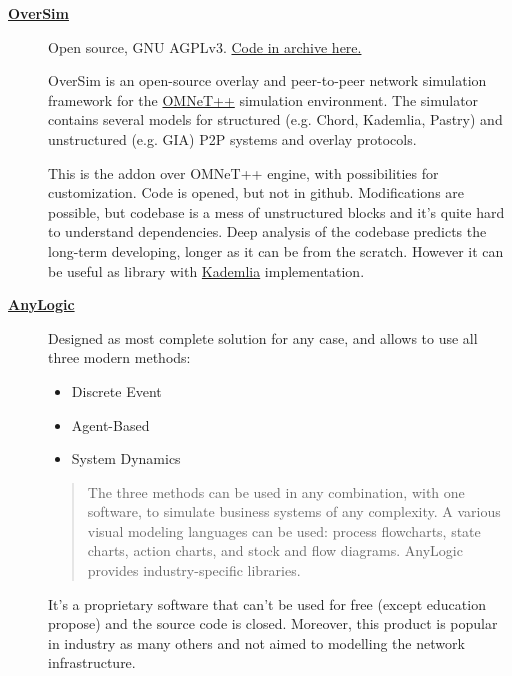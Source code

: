 \documentclass[12pt,oneside]{article}
\begin{document}
\begin{description}
                        \item[\href{http://www.oversim.org/wiki}{\textbf{OverSim}}]
                      Open source, GNU AGPLv3. \href{http://www.oversim.org/wiki/OverSimDownload}{Code in archive here.}

                      OverSim is an open-source overlay and peer-to-peer network simulation framework for the \href{https://omnetpp.org/}{OMNeT++} simulation environment. The simulator contains several models for structured (e.g. Chord, Kademlia, Pastry) and unstructured (e.g. GIA) P2P systems and overlay protocols.\par
                      This is the addon over OMNeT++ engine, with possibilities for customization. Code is opened, but not in github. Modifications are possible, but codebase is a mess of unstructured blocks and it's quite hard to understand dependencies. Deep analysis of the codebase predicts the long-term developing, longer as it can be from the scratch.
                      However it can be useful as library with \href{https://en.wikipedia.org/wiki/Kademlia}{Kademlia} implementation.

                        \item[\href{https://www.anylogic.com/}{\textbf{AnyLogic}}]
                      Designed as most complete solution for any case, and allows to use all three modern methods:
                          \begin{itemize}
                              \item Discrete Event
                              \item Agent-Based
                              \item System Dynamics
                          \end{itemize}
                          \begin{quote}
                          The three methods can be used in any combination, with one software, to simulate business systems of any complexity. A various visual modeling languages can be used: process flowcharts, state charts, action charts, and stock and flow diagrams. AnyLogic provides industry-specific libraries.\par
                          \end{quote}
                      It's a proprietary software that can't be used for free (except education propose) and the source code is closed. Moreover, this product is popular in industry as many others and not aimed to modelling the network infrastructure.

                      \end{description}
\end{document}
